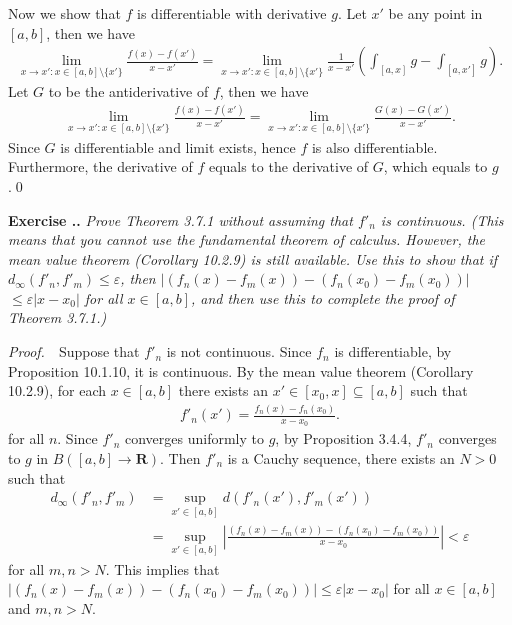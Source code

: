 \documentclass{book}
\newcommand{\pff}{\vspace{.25em}\noindent\emph{Proof.}~~}
\newcounter{Exercise}[section]
\renewcommand{\theExercise}{\thesection.\arabic{Exercise}.}
\newcommand{\new}{\vspace{1.5em}\noindent\textbf{Exercise \stepcounter{Exercise}\textbf{\theExercise}} }
\begin{document}
Now we show that $f$ is differentiable with derivative $g$. Let $x'$ be any point in $[a, b]$, then we have
    \begin{align*}
        \lim_{x \to x' : x \in [a, b] \setminus \{x'\}} \frac{f(x) - f(x')}{x - x'}
        = \lim_{x \to x' : x \in [a, b] \setminus \{x'\}} \frac{1}{x - x'} \left(\int_{[a, x]} g - \int_{[a, x']} g\right).
    \end{align*}
Let $G$ to be the antiderivative of $f$, then we have
    \begin{align*}
        \lim_{x \to x' : x \in [a, b] \setminus \{x'\}} \frac{f(x) - f(x')}{x - x'}
        = \lim_{x \to x' : x \in [a, b] \setminus \{x'\}} \frac{G(x) - G(x')}{x - x'}.
    \end{align*}
Since $G$ is differentiable and limit exists, hence $f$ is also differentiable. Furthermore, the derivative of $f$ equals to the derivative of $G$, which equals to $g$.\qed

\new\emph{Prove Theorem 3.7.1 without assuming that $f'_n$ is continuous. (This means that you cannot use the fundamental theorem of calculus. However, the mean value theorem (Corollary 10.2.9) is still available. Use this to show that if $d_{\infty}(f'_n, f'_m) \leq \varepsilon$, then $|(f_n(x) - f_m(x)) - (f_n(x_0) - f_m(x_0))|$ $\leq \varepsilon|x - x_0|$ for all $x \in [a, b]$, and then use this to complete the proof of Theorem 3.7.1.)}

\pff Suppose that $f'_n$ is not continuous. Since $f_n$ is differentiable, by Proposition 10.1.10, it is continuous. By the mean value theorem (Corollary 10.2.9), for each $x \in [a, b]$ there exists an $x' \in [x_0, x] \subseteq [a, b]$ such that
    \begin{align*}
        f'_n(x') = \frac{f_n(x) - f_n(x_0)}{x - x_0}.
    \end{align*}
for all $n$. Since $f'_n$ converges uniformly to $g$, by Proposition 3.4.4, $f'_n$ converges to $g$ in $B([a, b] \to \mathbf{R})$. Then $f'_n$ is a Cauchy sequence, there exists an $N > 0$ such that
    \begin{align*}
        d_{\infty}(f'_n, f'_m)
        &= \sup_{x' \in [a, b]} d(f'_n(x'), f'_m(x'))\\
        &= \sup_{x' \in [a, b]} \left| \frac{(f_n(x) - f_m(x)) - (f_n(x_0) - f_m(x_0))}{x - x_0} \right| < \varepsilon
    \end{align*}
for all $m, n > N$. This implies that $|(f_n(x) - f_m(x)) - (f_n(x_0) - f_m(x_0))| \leq \varepsilon|x - x_0|$ for all $x \in [a, b]$ and $m, n > N$.
\end{document}
